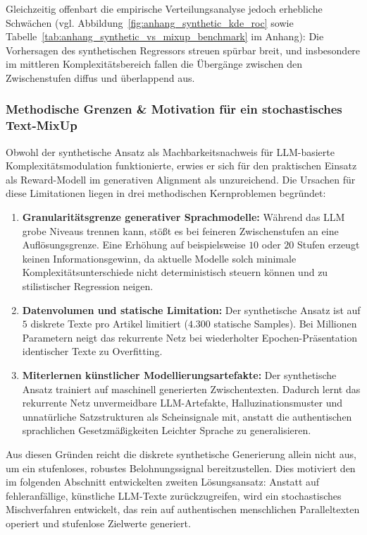 Gleichzeitig offenbart die empirische Verteilungsanalyse jedoch erhebliche Schwächen (vgl. Abbildung~\ref{fig:anhang_synthetic_kde_roc} sowie Tabelle~\ref{tab:anhang_synthetic_vs_mixup_benchmark} im Anhang): Die Vorhersagen des synthetischen Regressors streuen spürbar breit, und insbesondere im mittleren Komplexitätsbereich fallen die Übergänge zwischen den Zwischenstufen diffus und überlappend aus.

\subsubsection{Methodische Grenzen \& Motivation für ein stochastisches Text-MixUp}
\label{sec:synthetische_grenzen_ausmusterung}

Obwohl der synthetische Ansatz als Machbarkeitsnachweis für LLM-basierte Komplexitätsmodulation funktionierte, erwies er sich für den praktischen Einsatz als Reward-Modell im generativen Alignment als unzureichend. Die Ursachen für diese Limitationen liegen in drei methodischen Kernproblemen begründet:
\begin{enumerate}
    \item \textbf{Granularitätsgrenze generativer Sprachmodelle:} Während das LLM grobe Niveaus trennen kann, stößt es bei feineren Zwischenstufen an eine Auflösungsgrenze. Eine Erhöhung auf beispielsweise $10$ oder $20$ Stufen erzeugt keinen Informationsgewinn, da aktuelle Modelle solch minimale Komplexitätsunterschiede nicht deterministisch steuern können und zu stilistischer Regression neigen.
    \item \textbf{Datenvolumen und statische Limitation:} Der synthetische Ansatz ist auf $5$ diskrete Texte pro Artikel limitiert ($4.300$ statische Samples). Bei Millionen Parametern neigt das rekurrente Netz bei wiederholter Epochen-Präsentation identischer Texte zu Overfitting.
    \item \textbf{Miterlernen künstlicher Modellierungsartefakte:} Der synthetische Ansatz trainiert auf maschinell generierten Zwischentexten. Dadurch lernt das rekurrente Netz unvermeidbare LLM-Artefakte, Halluzinationsmuster und unnatürliche Satzstrukturen als Scheinsignale mit, anstatt die authentischen sprachlichen Gesetzmäßigkeiten Leichter Sprache zu generalisieren.
\end{enumerate}

Aus diesen Gründen reicht die diskrete synthetische Generierung allein nicht aus, um ein stufenloses, robustes Belohnungssignal bereitzustellen. Dies motiviert den im folgenden Abschnitt entwickelten zweiten Lösungsansatz: Anstatt auf fehleranfällige, künstliche LLM-Texte zurückzugreifen, wird ein stochastisches Mischverfahren entwickelt, das rein auf authentischen menschlichen Paralleltexten operiert und stufenlose Zielwerte generiert.


